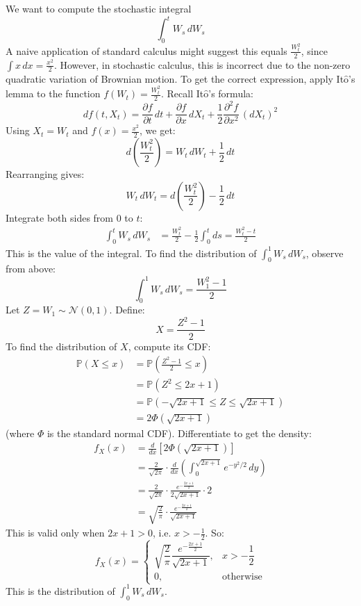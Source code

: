 \documentclass[12pt]{article}
\newcommand{\Itos}{It$\hat{\text{o}}$'s }
\begin{document}
We want to compute the stochastic integral
\[
\int_0^t W_s \, dW_s
\]
A naive application of standard calculus might suggest this equals \( \frac{W_t^2}{2} \), since \( \int x \, dx = \frac{x^2}{2} \).  
However, in stochastic calculus, this is incorrect due to the non-zero quadratic variation of Brownian motion.
To get the correct expression, apply \Itos lemma to the function \( f(W_t) = \frac{W_t^2}{2} \). Recall \Itos formula:
\[
df(t,X_t) = \frac{\partial f}{\partial t} \, dt + \frac{\partial f}{\partial x} \, dX_t + \frac{1}{2} \frac{\partial^2 f}{\partial x^2} \, (dX_t)^2
\]
Using \( X_t = W_t \) and \( f(x) = \frac{x^2}{2} \), we get:
\[
d\left(\frac{W_t^2}{2}\right) = W_t \, dW_t + \frac{1}{2} \, dt
\]
Rearranging gives:
\[
W_t \, dW_t = d\left(\frac{W_t^2}{2}\right) - \frac{1}{2} \, dt
\]
Integrate both sides from 0 to \( t \):
\begin{align*}
    \int_0^t W_s \, dW_s &= \frac{W_t^2}{2} - \frac{1}{2} \int_0^t ds = \frac{W_t^2 - t}{2}
\end{align*}
This is the value of the integral.
To find the distribution of \( \int_0^1 W_s \, dW_s \), observe from above:
\[
\int_0^1 W_s \, dW_s = \frac{W_1^2 - 1}{2}
\]
Let \( Z = W_1 \sim \mathcal{N}(0,1) \). Define:
\[
X = \frac{Z^2 - 1}{2}
\]
To find the distribution of \( X \), compute its CDF:
\begin{align*}
    \mathbb{P}(X \leq x) &= \mathbb{P}\left(\frac{Z^2 - 1}{2} \leq x\right) \\
    &= \mathbb{P}\left(Z^2 \leq 2x + 1\right) \\
    &= \mathbb{P}\left(-\sqrt{2x + 1} \leq Z \leq \sqrt{2x + 1}\right) \\
    &= 2 \Phi\left(\sqrt{2x + 1}\right)
\end{align*}
(where \( \Phi \) is the standard normal CDF).
Differentiate to get the density:
\begin{align*}
    f_X(x) &= \frac{d}{dx} \left[ 2 \Phi\left( \sqrt{2x + 1} \right)\right] \\
    &= \frac{2}{\sqrt{2\pi}} \cdot \frac{d}{dx} \left( \int_0^{\sqrt{2x+1}} e^{-y^2/2} \, dy \right) \\
    &= \frac{2}{\sqrt{2\pi}} \cdot \frac{e^{- \frac{2x + 1}{2}}}{2 \sqrt{2x + 1}} \cdot 2 \\
    &= \sqrt{\frac{2}{\pi}} \cdot \frac{e^{- \frac{2x + 1}{2}}}{\sqrt{2x + 1}}
\end{align*}
This is valid only when \( 2x + 1 > 0 \), i.e. \( x > -\frac{1}{2} \). So:
\[
f_X(x) = 
\begin{cases}
    \sqrt{\dfrac{2}{\pi}} \dfrac{e^{-\frac{2x+1}{2}}}{\sqrt{2x+1}}, & x > -\dfrac{1}{2} \\
    0, & \text{otherwise}
\end{cases}
\]
This is the distribution of \( \int_0^1 W_s \, dW_s \).
\end{document}
